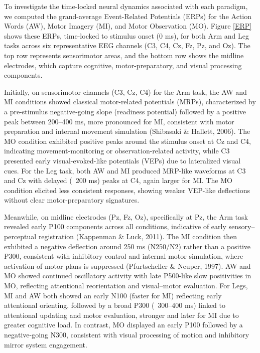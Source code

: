 \documentclass[10pt,letterpaper]{article}
\begin{document}
To investigate the time-locked neural dynamics associated with each paradigm, we computed the grand-average Event-Related Potentials (ERPs) for the Action Words (AW), Motor Imagery (MI), and Motor Observation (MO). Figure \ref{ERP} shows these ERPs, time-locked to stimulus onset (0 ms), for both Arm and Leg tasks across six representative EEG channels (C3, C4, Cz, Fz, Pz, and Oz). The top row represents sensorimotor areas, and the bottom row shows the midline electrodes, which capture cognitive, motor-preparatory, and visual processing components.

Initially, on sensorimotor channels (C3, Cz, C4) for the Arm task, the AW and MI conditions showed classical motor-related potentials (MRPs), characterized by a pre-stimulus negative-going slope (readiness potential) followed by a positive peak between 200–400 ms, more pronounced for MI, consistent with motor preparation and internal movement simulation (Shibasaki \& Hallett, 2006). The MO condition exhibited positive peaks around the stimulus onset at Cz and C4, indicating movement-monitoring or observation-related activity, while C3 presented early visual-evoked-like potentials (VEPs) due to lateralized visual cues. For the Leg task, both AW and MI produced MRP-like waveforms at C3 and Cz with delayed (~200 ms) peaks at C4, again larger for MI. The MO condition elicited less consistent responses, showing weaker VEP-like deflections without clear motor-preparatory signatures.

Meanwhile, on midline electrodes (Pz, Fz, Oz), specifically at Pz, the Arm task revealed early P100 components across all conditions, indicative of early sensory–perceptual registration (Kappenman \& Luck, 2011). The MI condition then exhibited a negative deflection around 250 ms (N250/N2) rather than a positive P300, consistent with inhibitory control and internal motor simulation, where activation of motor plans is suppressed (Pfurtscheller \& Neuper, 1997). AW and MO showed continued oscillatory activity with late P500-like slow positivities in MO, reflecting attentional reorientation and visual–motor evaluation. For Legs, MI and AW both showed an early N100 (faster for MI) reflecting early attentional orienting, followed by a broad P300 (~300–400 ms) linked to attentional updating and motor evaluation, stronger and later for MI due to greater cognitive load. In contrast, MO displayed an early P100 followed by a negative-going N300, consistent with visual processing of motion and inhibitory mirror system engagement.
\end{document}

